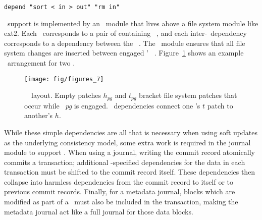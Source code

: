 \vspace{-0.5\baselineskip}
\begin{center}
\begin{small}
\verb+depend "sort < in > out" "rm in"+
\end{small}
\end{center}
\vspace{-0.5\baselineskip}


\Patchgroup\ support is implemented by an \LFS\ module that lives above a file
system module like ext2.
%
Each \patchgroup\ corresponds to a pair of containing \noop\ \patches,
and each inter-\patchgroup\ dependency corresponds to a dependency between
the \noop\ \patches.
%
The \LFS\ module ensures that all file system changes are inserted
between engaged \patchgroups' \noop\ \patches.
%
Figure~\ref{fig:patchgroup-patches} shows an example \patch\ arrangement for
two \patchgroups.

\begin{figure}[t]
\centering
\texttt{[image: fig/figures\_7]}
\caption{\label{fig:patchgroup-patches} \Patchgroup\ \patch\ layout.  Empty
patches $h_\textit{pg}$ and $t_\textit{pg}$ bracket file system patches that occur while
\patchgroup\ \textit{pg} is engaged.  \Patchgroup\ dependencies connect one
\patchgroup's $t$ patch to another's $h$.}
\end{figure}

While these simple dependencies are all that is necessary when using soft
updates as the underlying consistency model, some extra work is required in the
journal module to support \patchgroups.
%
When using a journal, writing the commit record atomically commits a
transaction; additional \patchgroup-specified dependencies for the data in each
transaction must be shifted to the commit record itself.
%
These dependencies then collapse into harmless dependencies from the commit
record to itself or to previous commit records.
%
Finally, for a metadata journal, blocks which are modified as part of a
\patchgroup\ must also be included in the transaction, making the metadata
journal act like a full journal for those data blocks.

